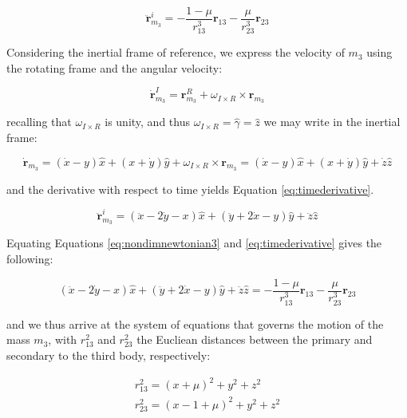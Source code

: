 \begin{equation}\label{eq:nondimnewtonian3}
\ddot{\pmb{r}}^i_{m_3} = -\frac{1-\mu}{r^3_{13}}\pmb{r}_{13} - \frac{\mu}{r^3_{23}} \pmb{r}_{23}
\end{equation}

\noindent Considering the inertial frame of reference, we express the velocity of $m_3$ using the rotating frame and the angular velocity:

\begin{equation}
\dot{\pmb{r}}^I_{m_3} = \pmb{r}^R_{m_3} + \omega_{I\times R} \times \pmb{r}_{m_3}
\end{equation}

\noindent recalling that $\omega_{I\times R}$ is unity, and thus $\omega_{I\times R} = \hat{\gamma} = \hat{z}$ we may write in the inertial frame:

\begin{equation}
\dot{\pmb{r}}_{m_3} = (\dot{x} - y)\hat{x} + (x+\dot{y})\hat{y} + \omega_{I\times R} \times \pmb{r}_{m_3} = (\dot{x} - y)\hat{x} + (x+\dot{y})\hat{y} + \dot{z}\hat{z}
\end{equation}

\noindent and the derivative with respect to time yields Equation \ref{eq:timederivative}.

\begin{equation}\label{eq:timederivative}
\ddot{\pmb{r}}^i_{m_3} = (\ddot{x} - 2\dot{y} - x)\hat{x} + (\ddot{y} + 2\dot{x} - y)\hat{y} + \ddot{z}\hat{z}
\end{equation}

\noindent Equating Equations \ref{eq:nondimnewtonian3} and \ref{eq:timederivative} gives the following:

\begin{equation}\label{eq:governingequations}
(\ddot{x} - 2\dot{y} - x)\hat{x} + (\ddot{y} + 2\dot{x} - y)\hat{y} + \ddot{z}\hat{z} = -\frac{1-\mu}{r^3_{13}}\pmb{r}_{13} - \frac{\mu}{r^3_{23}} \pmb{r}_{23}
\end{equation}

\noindent and we thus arrive at the system of equations that governs the motion of the mass $m_3$, with $r^2_{13}$ and $r^2_{23}$ the Eucliean distances between the primary and secondary to the third body, respectively:

\begin{align}\label{eq:euclideandistances}
r^2_{13} = (x+\mu)^2 + y^2 + z^2 \\
r^2_{23} = (x - 1 + \mu)^2 + y^2 + z^2
\end{align}

